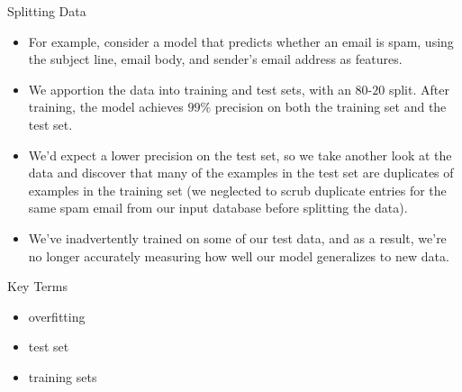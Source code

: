\documentclass{beamer}
\begin{document}
\begin{frame}{Splitting Data}
\begin{itemize}
    \item For example, consider a model that predicts whether an email is spam, using the subject line, email body, and sender's email address as features. 
    \item We apportion the data into training and test sets, with an $80$-$20$ split. After training, the model achieves $99\%$ precision on both the training set and the test set. 
    \item We'd expect a lower precision on the test set, so we take another look at the data and discover that many of the examples in the test set are duplicates of examples in the training set (we neglected to scrub duplicate entries for the same spam email from our input database before splitting the data). 
    \item We've inadvertently trained on some of our test data, and as a result, we're no longer accurately measuring how well our model generalizes to new data.
\end{itemize}
\end{frame}

\begin{frame}{Key Terms}
\begin{itemize}
    \item overfitting
    \item test set
    \item training sets
\end{itemize}
\end{frame}
\end{document}
